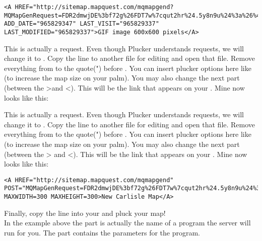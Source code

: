 \begin{verbatim}
<A HREF="http://sitemap.mapquest.com/mqmapgend?MQMapGenRequest=FDR2dmwjDE%3bf72g%26FDT7w%7cqut2hr%24.5y8n9u%24%3a%26%40%24%3a%26z%240u6%240u6%24PK%18%19%3dTPWIK,rn061g%26%3dy0du2n%26%40%24%3a%26%40%24%3a1%40" ADD_DATE="965829347" LAST_VISIT="965829337" LAST_MODIFIED="965829337">GIF image 600x600 pixels</A>
\end{verbatim}

\begin{latexonly}
This is actually a  request. Even though Plucker understands
 requests, we will change it to .
Copy the line to another file for editing and open that file.
Remove everything from  to the quote(") before 
. You can insert plucker options here like 
 (to increase the map size on 
your palm). You may also change the next part (between the 
\textgreater and \textless). This will be the link that appears 
on your . Mine now looks like this:
\end{latexonly}
\begin{htmlonly}
This is actually a  request. Even though Plucker understands
 requests, we will change it to .
Copy the line to another file for editing and open that file.
Remove everything from  to the quote(") before 
. You can insert plucker options here like 
 (to increase the map size on 
your palm). You may also change the next part (between the > 
and <). This will be the link that appears on your 
.  Mine now looks like this:
\end{htmlonly}

\begin{verbatim}
<A HREF="http://sitemap.mapquest.com/mqmapgend" POST="MQMapGenRequest=FDR2dmwjDE%3bf72g%26FDT7w%7cqut2hr%24.5y8n9u%24%3a%26%40%24%3a%26z%240u6%240u6%24PK%18%19%3dTPWIK,rn061g%26%3dy0du2n%26%40%24%3a%26%40%24%3a1%40" MAXWIDTH=300 MAXHEIGHT=300>New Carlisle Map</A>
\end{verbatim}

Finally, copy the line into your  and pluck your map!\\

\note{} In the example above the  part 
is actually the name of a program the server will run for you.
The  part contains the parameters for the program. 



